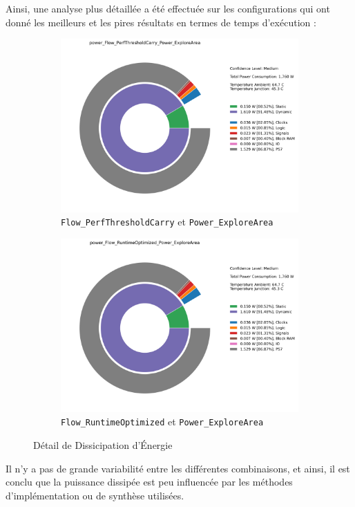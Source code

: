 \documentclass[../CSC_5RO07_TA.tex]{subfiles}
\begin{document}
\noindent Ainsi, une analyse plus détaillée a été effectuée sur les configurations qui ont donné les meilleurs et les pires résultats en termes de temps d'exécution :
\begin{figure}[H]
    \centering
    \begin{subfigure}[b]{0.475\textwidth}
        \centering
        \includegraphics[width=\linewidth]{images/3_power_Flow_PerfThresholdCarry_Power_ExploreArea.png}
        \caption{\texttt{Flow\_PerfThresholdCarry} et \texttt{Power\_ExploreArea}}
    \end{subfigure}\hfill
    \begin{subfigure}[b]{0.475\textwidth}
        \centering
        \includegraphics[width=\linewidth]{images/3_power_Flow_RuntimeOptimized_Power_ExploreArea.png}
        \caption{\texttt{Flow\_RuntimeOptimized} et \texttt{Power\_ExploreArea}}
    \end{subfigure}
    \caption{Détail de Dissicipation d'Énergie}
    \label{fig:power_detail_3}
\end{figure}
\noindent Il n'y a pas de grande variabilité entre les différentes combinaisons, et ainsi, il est conclu que la puissance dissipée est peu influencée par les méthodes d'implémentation ou de synthèse utilisées.
\end{document}
